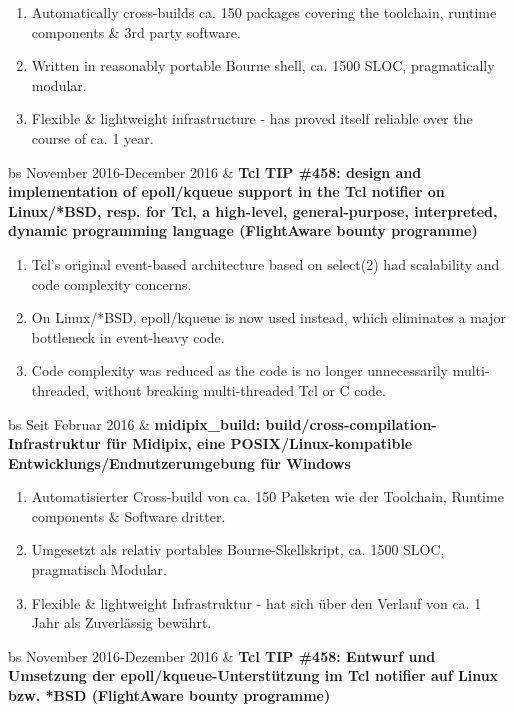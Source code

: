 \documentclass{article}
\begin{document}
\begin{table}
{\begin{enumerate}
      \item Automatically cross-builds ca. 150 packages covering the toolchain, runtime components \& 3rd party software.
      \item Written in reasonably portable Bourne shell, ca. 1500 SLOC, pragmatically modular.
      \item Flexible \& lightweight infrastructure - has proved itself reliable over the course of ca. 1 year.
    \end{enumerate}
    \begin{tabularx}{\linewidth}{bs}
      November 2016-December 2016 & \bf{Tcl TIP \#458: design and implementation of epoll/kqueue support in the Tcl notifier on Linux/*BSD, resp. for Tcl, a high-level, general-purpose, interpreted, dynamic programming language (FlightAware bounty programme)}
    \end{tabularx}
    \begin{enumerate}
      \item Tcl's original event-based architecture based on select(2) had scalability and code complexity concerns.
      \item On Linux/*BSD, epoll/kqueue is now used instead, which eliminates a major bottleneck in event-heavy code.
      \item Code complexity was reduced as the code is no longer unnecessarily multi-threaded, without breaking multi-threaded Tcl or C code.
    \end{enumerate}
  }{
    \caption{Projektbeteiligungen}
    \begin{tabularx}{\linewidth}{bs}
      Seit Februar 2016 & \bf{midipix\_build: build/cross-compilation-Infrastruktur für Midipix, eine POSIX/Linux-kompatible Entwicklungs/Endnutzerumgebung für Windows}
    \end{tabularx}
    \begin{enumerate}
      \item Automatisierter Cross-build von ca. 150 Paketen wie der Toolchain, Runtime components \& Software dritter.
      \item Umgesetzt als relativ portables Bourne-Skellskript, ca. 1500 SLOC, pragmatisch Modular.
      \item Flexible \& lightweight Infrastruktur - hat sich über den Verlauf von ca. 1 Jahr als Zuverlässig bewährt.
    \end{enumerate}
    \begin{tabularx}{\linewidth}{bs}
      November 2016-Dezember 2016 & \bf{Tcl TIP \#458: Entwurf und Umsetzung der epoll/kqueue-Unterstützung im Tcl notifier auf Linux bzw. *BSD (FlightAware bounty programme)}

\end{tabularx}}
\end{table}
\end{document}
